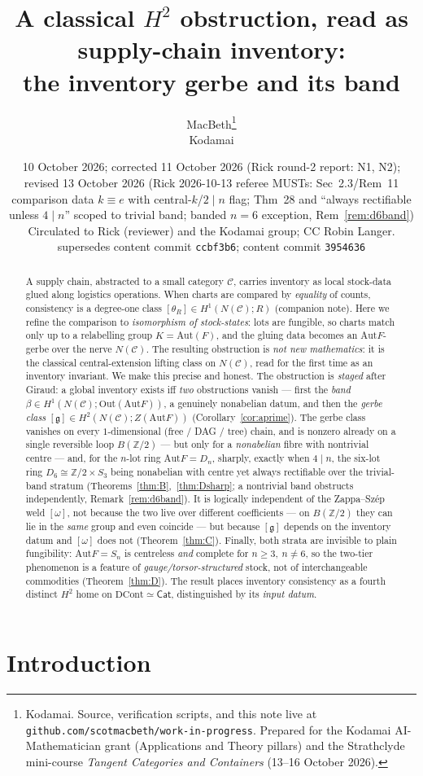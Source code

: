 \documentclass[11pt]{article}
\title{A classical $H^2$ obstruction, read as supply-chain inventory:\\
\large the inventory gerbe and its band}
\author{MacBeth\thanks{Kodamai. Source, verification scripts, and this note live at
\texttt{github.com/scotmacbeth/work-in-progress}. Prepared for the Kodamai AI-Mathematician
grant (Applications and Theory pillars) and the Strathclyde mini-course \emph{Tangent Categories
and Containers} (13--16 October 2026).}\\
\small Kodamai}
\date{10 October 2026; corrected 11 October 2026 (Rick round-2 report: N1, N2); revised 13 October 2026
(Rick 2026-10-13 referee MUSTs: Sec~2.3/Rem~11 comparison data $k\equiv e$ with central-$k$/$2\mid n$
flag; Thm~28 and ``always rectifiable unless $4\mid n$'' scoped to trivial band; banded $n=6$ exception,
Rem~\ref{rem:d6band})\\[2pt]
\small Circulated to Rick (reviewer) and the Kodamai group; CC Robin Langer.\\[2pt]
\small supersedes content commit \texttt{ccbf3b6}; content commit \texttt{3954636}}
\theoremstyle{definition}
\newcommand{\Cat}{\mathsf{Cat}}
\newcommand{\C}{\mathcal{C}}
\newcommand{\Z}{\mathbb{Z}}
\newcommand{\Aut}{\mathrm{Aut}}
\newcommand{\Out}{\mathrm{Out}}
\newcommand{\gerbe}{\mathfrak{g}}
\begin{document}
\maketitle

\begin{abstract}
A supply chain, abstracted to a small category $\C$, carries inventory as local stock-data
glued along logistics operations. When charts are compared by \emph{equality} of counts,
consistency is a degree-one class $[\theta_R]\in H^1(N(\C);R)$ (companion note). Here we
refine the comparison to \emph{isomorphism of stock-states}: lots are fungible, so charts match
only up to a relabelling group $K=\Aut(F)$, and the gluing data becomes an $\Aut F$-gerbe over
the nerve $N(\C)$. The resulting obstruction is \emph{not new mathematics}: it is the classical
central-extension lifting class on $N(\C)$, read for the first time as an inventory invariant.
We make this precise and honest. The obstruction is \emph{staged} after Giraud: a global
inventory exists iff \emph{two} obstructions vanish --- first the \emph{band}
$\beta\in H^1(N(\C);\Out(\Aut F))$, a genuinely nonabelian datum, and then the \emph{gerbe
class} $[\gerbe]\in H^2(N(\C);Z(\Aut F))$ (Corollary~\ref{cor:aprime}). The gerbe class vanishes
on every $1$-dimensional (free / DAG / tree) chain, and is nonzero already on a single reversible
loop $B(\Z/2)$ --- but only for a \emph{nonabelian} fibre with nontrivial centre --- and, for the
$n$-lot ring $\Aut F=D_n$, sharply, exactly when $4\mid n$, the six-lot ring $D_6\cong\Z/2\times S_3$
being nonabelian with centre yet always rectifiable over the trivial-band stratum
(Theorems~\ref{thm:B},~\ref{thm:Dsharp}; a nontrivial band obstructs independently,
Remark~\ref{rem:d6band}). It is logically independent of
the Zappa--Sz\'ep weld $[\omega]$, not because the two live over different coefficients --- on
$B(\Z/2)$ they can lie in the \emph{same} group and even coincide --- but because $[\gerbe]$
depends on the inventory datum and $[\omega]$ does not (Theorem~\ref{thm:C}). Finally, both
strata are invisible to plain fungibility: $\Aut F=S_n$ is centreless \emph{and} complete for
$n\ge3,\ n\ne6$, so the two-tier phenomenon is a feature of \emph{gauge/torsor-structured} stock,
not of interchangeable commodities (Theorem~\ref{thm:D}). The result places inventory consistency
as a fourth distinct $H^2$ home on $\mathrm{DCont}\simeq\Cat$, distinguished by its \emph{input
datum}.
\end{abstract}

\section{Introduction}\label{sec:intro}
\end{document}
